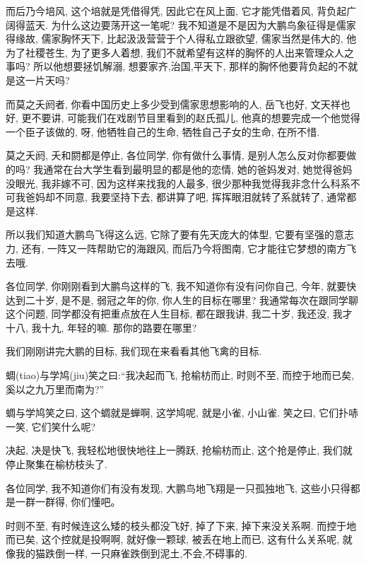 \documentclass[11pt]{article}
\begin{document}
{\color{blue} 而后乃今培风}, 这个培就是凭借得凭, 因此它在风上面, 它才能凭借着风, 背负起广阔得蓝天. 为什么这边要荡开这一笔呢? 我不知道是不是因为大鹏鸟象征得是儒家得缘故, 儒家胸怀天下, 比起汲汲营营于个人得私立跟欲望, 儒家当然是伟大的, 他为了社稷苍生, 为了更多人着想, 我们不就希望有这样的胸怀的人出来管理众人之事吗? 所以他想要拯饥解溺, 想要家齐,治国,平天下, 那样的胸怀他要背负起的不就是这一片天吗? 

{\color{blue} 而莫之夭阏者}, 你看中国历史上多少受到儒家思想影响的人, 岳飞也好, 文天祥也好, 更不要讲, 可能我们在戏剧节目里看到的赵氏孤儿, 他真的想要完成一个他觉得一个臣子该做的, 呀, 他牺牲自己的生命, 牺牲自己子女的生命, 在所不惜.

{\color{blue} 莫之夭阏}, 夭和閼都是停止, 各位同学, 你有做什么事情, 是别人怎么反对你都要做的吗? 我通常在台大学生看到最明显的都是他的恋情, 她的爸妈发对, 她觉得爸妈没眼光, 我非嫁不可, 因为这样来找我的人最多, 很少那种我觉得我非念什么科系不可我爸妈却不同意, 我要坚持下去, 都讲算了吧, 挥挥眼泪就转了系就转了, 通常都是这样. 

所以我们知道大鹏鸟飞得这么远, 它除了要有先天庞大的体型, 它要有坚强的意志力, 还有, 一阵又一阵帮助它的海跟风, {\color{blue}  而后乃今将图南}, 它才能往它梦想的南方飞去哦. 

各位同学, 你刚刚看到大鹏鸟这样的飞, 我不知道你有没有问你自己, 今年, 就要快达到二十岁, 是不是, 弱冠之年的你, 你人生的目标在哪里? 我通常每次在跟同学聊这个问题, 同学都没有把重点放在人生目标, 都在跟我讲, 我二十岁, 我还没, 我才十八, 我十九, 年轻的嘛. 那你的路要在哪里? 

我们刚刚讲完大鹏的目标, 我们现在来看看其他飞禽的目标.

\begin{center}
	{\color{magenta} 蜩(tiao)与学鸠(jiu)笑之曰:“我决起而飞, 抢榆枋而止, 时则不至, 而控于地而已矣, 奚以之九万里而南为?” }
\end{center}

\vspace{-0.5cm}

{\color{blue}蜩与学鸠笑之曰}, 这个蜩就是蝉啊, 这学鸠呢, 就是小雀, 小山雀. 笑之曰, 它们扑哧一笑, 它们笑什么呢?

决起, 决是快飞, 我轻松地很快地往上一腾跃, {\color{blue} 抢榆枋而止}, 这个抢是停止, 我们就停止聚集在榆枋枝头了.

各位同学, 我不知道你们有没有发现, 大鹏鸟地飞翔是一只孤独地飞, 这些小只得都是一群一群得, 你们懂吧。

{\color{blue} 时则不至}, 有时候连这么矮的枝头都没飞好, 掉了下来, 掉下来没关系啊. {\color{blue} 而控于地而已矣}, 这个控就是投啊啊, 就好像一颗球, 被丢在地上而已, 这有什么关系呢, 就像我的猫跌倒一样, 一只麻雀跌倒到泥土,不会,不碍事的.
\end{document}
